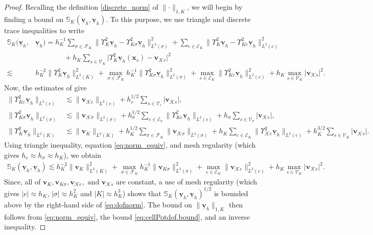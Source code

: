 \documentclass[a4paper,11pt]{article}
\theoremstyle{definition}
\theoremstyle{remark}
\newcommand{\norm}[2]{\|#2\|_{#1}}
\newcommand{\uvec}[1]{\underline{\mathbf{#1}}}
\newcommand{\bvec}[1]{\boldsymbol{#1}}
\newcommand{\bo}[1]{\mathbf{#1}}
\newcommand{\bx}{\bvec{x}}
\newcommand{\up}[1]{\Upsilon^2_{#1}}
\def\cE{\mathcal{E}}
\def\cF{\mathcal{F}}
\def\cK{\mathcal{K}}
\newcommand{\Ks}{{\mathcal{K}s}}
\newcommand{\Ke}{{\mathcal{K}e}}
\def\Ksig{{K\!\sigma}}
\begin{document}
\begin{proof}
Recalling the definition \eqref{discrete_norm} of $\lVert\cdot\rVert_{1,K}$, we will begin by finding a bound on $\mathbb S_K(\uvec{v}_h,\uvec{v}_h)$. To this purpose, we use triangle and discrete trace inequalities \cite[Lemma 1.32]{hho-book} to write
\begin{align*}
\mathbb S_K(\uvec{v}_h,{}&\uvec{v}_h)=h^{-1}_K\sum_{\sigma\in\cF_K}\lVert \Upsilon^2_K\uvec{v}_h-\Upsilon^2_{K\sigma}\uvec{v}_h\rVert_{L^2(\sigma)}^2+\sum_{e\in\cE_K}\lVert \Upsilon^2_K\uvec{v}_h-\Upsilon^2_{Ke}\uvec{v}_h\rVert_{L^2(e)}^2\\
&\qquad\qquad+h_K\sum_{s\in\mathcal V_K}\lvert \Upsilon^2_K\uvec{v}_h(\bx_s)-\bo{v}_{\cK s }\rvert^2\\
\lesssim{}& h^{-2}_K\lVert \Upsilon^2_K\uvec{v}_h\rVert^2_{L^2(K)}+\max_{\sigma\in\cF_K}h^{-1}_K\lVert \Upsilon^2_{K\sigma}\uvec{v}_{h}\rVert^2_{L^2(\sigma)}
+\max_{e\in\cE_K}\lVert \Upsilon^2_{Ke}\uvec{v}_h\rVert^2_{L^2(e)}+h_K\max_{s\in\mathcal V_K}\lvert \bo{v}_{\cK s}\rvert^2.
\end{align*}
Now, the estimates of \cite[Lemma 8]{Di-Pietro.Droniou.ea:24} give
\begin{align}
\lVert \up{Ke}\uvec{v}_h\rVert_{L^2(e)}&\lesssim \norm{L^2(e)}{\bo{v}_\Ke} + h^{1/2}_e\sum_{s\in\mathcal V_e}\lvert \bo{v}_\Ks\rvert,\nonumber\\%
\lVert \up{K\sigma}\uvec{v}_h\rVert_{L^2(\sigma)}&\lesssim \norm{L^2(\sigma)}{\bo{v}_{\cK\sigma}} + h_\sigma^{1/2}\sum_{e\in\cE_\sigma}\norm{L^2(e)}{\up{Ke}\uvec{v}_h}
+h_\sigma \sum_{s\in\mathcal V_\sigma}\lvert \bo{v}_\Ks\rvert, \nonumber\\ %
\lVert \up{K}\uvec{v}_h\rVert_{L^2(K)}&\lesssim \norm{L^2(K)}{\bo{v}_K} + h_K^{1/2}\sum_{\sigma\in\cF_K} \norm{L^2(\sigma)}{\bo{v}_{\cK\sigma}} + h_K\sum_{e\in\cE_K}\norm{L^2(e)}{\up{\Ke}\uvec{v}_h}+h_K^{3/2}\sum_{s\in\mathcal V_K}\lvert \bo{v}_\Ks\rvert.\label{eq:cellPotdof.bound}
\end{align}
Using triangle inequality, equation \eqref{eq:norm_equiv}, and mesh regularity (which gives $h_e\approx h_{\sigma}\approx h_K$), we obtain
\begin{align*}
\mathbb S_K(\uvec{v}_h,\uvec{v}_h)\lesssim h^{-2}_K\lVert \bo{v}_K\rVert_{L^2(K)}^2+\max_{\sigma\in\cF_K}h^{-1}_K\lVert \bo{v}_{\Ksig}\rVert^2_{L^2(\sigma)}+\max_{e\in\cE_K}\lVert \bo{v}_{\cK e}\rVert^2_{L^2(e)}+h_K\max_{s\in\mathcal V_K}\lvert \bo{v}_{\cK s}\rvert^2.
\end{align*}
Since, all of $\bo{v}_K, \bo{v}_{\Ksig},\bo{v}_{\cK e}, \text{ and }\bo{v}_{\cK s}$ are constant, a use of mesh regularity (which gives $|e|\approx h_K$, $|\sigma|\approx h_K^2$ and $|K|\approx h^3_K$) shows that $\mathbb S_K(\uvec{v}_h,\uvec{v}_h)^{1/2}$ is bounded above by the right-hand side of \eqref{eq:dofnorm}. The bound on $\lVert \uvec{v}_h\rVert_{1,K}$ then follows from \eqref{eq:norm_equiv}, the bound \eqref{eq:cellPotdof.bound}, and an inverse inequality.
\end{proof}
\end{document}
